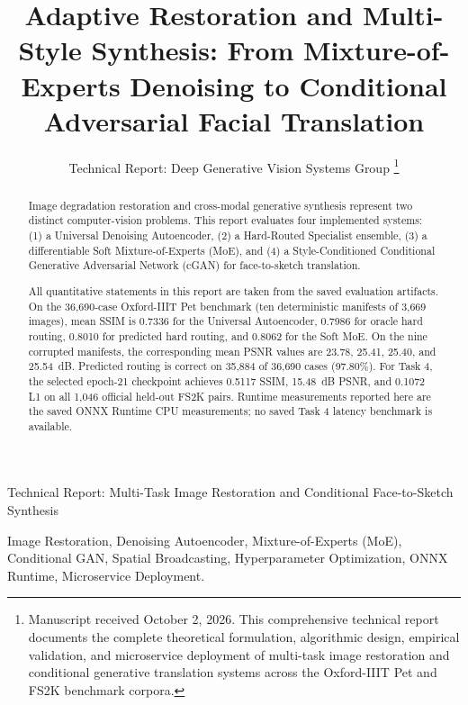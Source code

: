 \documentclass[journal,compsoc]{IEEEtran}
\begin{document}
\title{Adaptive Restoration and Multi-Style Synthesis: From Mixture-of-Experts Denoising to Conditional Adversarial Facial Translation}

\author{Technical Report: Deep Generative Vision Systems Group%
\thanks{Manuscript received October 2, 2026. This comprehensive technical report documents the complete theoretical formulation, algorithmic design, empirical validation, and microservice deployment of multi-task image restoration and conditional generative translation systems across the Oxford-IIIT Pet and FS2K benchmark corpora.}
}

%
{Technical Report: Multi-Task Image Restoration and Conditional Face-to-Sketch Synthesis}

\maketitle

\begin{abstract}
Image degradation restoration and cross-modal generative synthesis represent two distinct computer-vision problems. This report evaluates four implemented systems: (1) a Universal Denoising Autoencoder, (2) a Hard-Routed Specialist ensemble, (3) a differentiable Soft Mixture-of-Experts (MoE), and (4) a Style-Conditioned Conditional Generative Adversarial Network (cGAN) for face-to-sketch translation.

All quantitative statements in this report are taken from the saved evaluation artifacts. On the 36,690-case Oxford-IIIT Pet benchmark (ten deterministic manifests of 3,669 images), mean SSIM is 0.7336 for the Universal Autoencoder, 0.7986 for oracle hard routing, 0.8010 for predicted hard routing, and 0.8062 for the Soft MoE. On the nine corrupted manifests, the corresponding mean PSNR values are 23.78, 25.41, 25.40, and 25.54~dB. Predicted routing is correct on 35,884 of 36,690 cases (97.80\%). For Task 4, the selected epoch-21 checkpoint achieves 0.5117 SSIM, 15.48~dB PSNR, and 0.1072 L1 on all 1,046 official held-out FS2K pairs. Runtime measurements reported here are the saved ONNX Runtime CPU measurements; no saved Task 4 latency benchmark is available.
\end{abstract}

\begin{IEEEkeywords}
Image Restoration, Denoising Autoencoder, Mixture-of-Experts (MoE), Conditional GAN, Spatial Broadcasting, Hyperparameter Optimization, ONNX Runtime, Microservice Deployment.
\end{IEEEkeywords}
\end{document}
